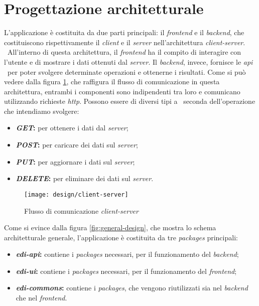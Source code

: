 \section{Progettazione architetturale}

L'applicazione è costituita da due parti principali: il \emph{\gls{frontend}} e il \emph{\gls{backend}}, che costituiscono rispettivamente il \emph{client} e il \emph{server} nell'architettura \emph{client-server}. \
All'interno di questa architettura, il \emph{\gls{frontend}} ha il compito di interagire con l'utente e di mostrare i dati ottenuti dal \emph{server}. Il \emph{\gls{backend}}, invece, fornisce le \emph{\acrshort{api}} \
per poter svolgere determinate operazioni e ottenerne i risultati. Come si può vedere dalla figura \ref{fig:client-server}, che raffigura il flusso di comunicazione in questa architettura, entrambi i componenti sono indipendenti tra loro e comunicano utilizzando richieste \emph{\acrshort{http}}. Possono essere di diversi tipi a \
seconda dell'operazione che intendiamo svolgere: 
\begin{itemize}
  \item \textbf{\emph{GET}:} per ottenere i dati dal \emph{server};
  \item \textbf{\emph{POST}:} per caricare dei dati sul \emph{server};
  \item \textbf{\emph{PUT}:} per aggiornare i dati sul \emph{server};
  \item \textbf{\emph{DELETE}:} per eliminare dei dati sul \emph{server}.
\end{itemize} 

\begin{figure}[!ht]
  \begin{center}
    \texttt{[image: design/client-server]}
    \caption{Flusso di comunicazione \emph{client-server}}
    \label{fig:client-server}
  \end{center}
\end{figure}

Come si evince dalla figura \ref{fig:general-design}, che mostra lo schema architetturale generale, l'applicazione è costituita da tre \emph{packages} principali:
\begin{itemize}
  \item \textbf{\emph{edi-api}:} contiene i \emph{packages} necessari, per il funzionamento del \emph{\gls{backend}};
  \item \textbf{\emph{edi-ui}:} contiene i \emph{packages} necessari, per il funzionamento del \emph{\gls{frontend}};
  \item \textbf{\emph{edi-commons}:} contiene i \emph{packages}, che vengono riutilizzati sia nel \emph{\gls{backend}} che nel \emph{\gls{frontend}}.
\end{itemize}

